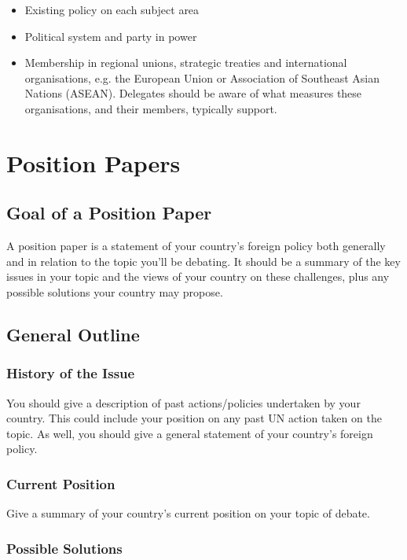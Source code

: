 \documentclass[11pt,a4paper]{report}
\begin{document}
\begin{itemize}
	\item Existing policy on each subject area
	\item Political system and party in power
	\item Membership in regional unions, strategic treaties and international organisations, e.g. the European Union or Association of Southeast Asian Nations (ASEAN). Delegates should be aware of what measures these organisations, and their members, typically support.
\end{itemize}

\section{Position Papers}

\subsection{Goal of a Position Paper}

A position paper is a statement of your country's foreign policy both generally and in relation to the topic you'll be debating. It should be a summary of the key issues in your topic and the views of your country on these challenges, plus any possible solutions your country may propose.  

\subsection{General Outline}

\subsubsection{History of the Issue}

You should give a description of past actions/policies undertaken by your country. This could include your position on any past UN action taken on the topic. As well, you should give a general statement of your country's foreign policy.

\subsubsection{Current Position}

Give a summary of your country's current position on your topic of debate. 

\subsubsection{Possible Solutions}
\end{document}
